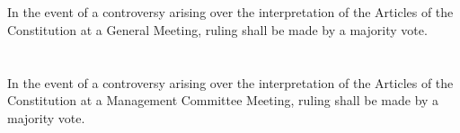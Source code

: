 
\section{}
In the event of a controversy arising over the interpretation of the Articles of the Constitution at a General Meeting, ruling shall be made by a majority vote.

\section{}
In the event of a controversy arising over the interpretation of the Articles of the Constitution at a Management Committee Meeting, ruling shall be made by a majority vote.